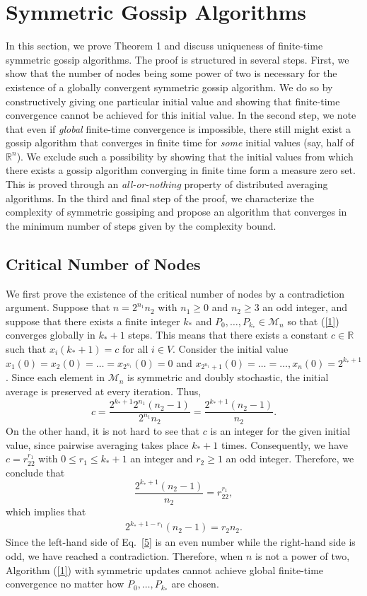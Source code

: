 \documentclass[a4paper, 11pt]{article}
\begin{document}
\section{Symmetric Gossip Algorithms}\label{Sec:Symmetric}
In this section, we prove Theorem 1 and discuss uniqueness of finite-time symmetric gossip algorithms. The proof is structured in several steps. First, we show that the number of nodes being some power of two is necessary for the existence of a globally convergent symmetric gossip algorithm. We do so by constructively giving one particular initial value and showing that finite-time convergence cannot be achieved for this initial value. In the second step, we note that even if {\it global} finite-time convergence is impossible, there still might exist a gossip algorithm that converges in finite time  for \emph{some} initial values (say, half of $\mathbb{R}^n$).  We exclude such a possibility by showing that the initial values from which there exists a gossip algorithm converging in finite time  form a measure zero set. This is proved through an {\em all-or-nothing} property of distributed averaging algorithms.  In the third and final step of the proof, we characterize the complexity of symmetric gossiping and propose an algorithm that converges in the minimum number of steps given by the complexity bound.



\subsection{Critical Number of Nodes} We first prove the existence of the critical number of nodes by a contradiction argument.  Suppose that $n=2^{n_1} n_2$ with $n_1\geq0$ and $n_2\geq 3$ an odd integer, and suppose that there exists a finite integer $k_\ast$ and $P_0,\dots, P_{k_\ast}\in \mathscr{M}_n$ so that (\ref{1}) converges globally in $k_\ast+1$ steps.  This means that there exists a constant $c\in \mathbb{R}$ such that $x_i(k_\ast+1)=c$ for all $i\in V$.
Consider the initial value $x_1(0)=x_2(0)=\dots=x_{2^{n_1}}(0)=0$ and $x_{2^{n_1}+1}(0)=\dots=\dots,x_n(0)=2^{k_\ast+1}$. Since each element in $ \mathscr{M}_n$ is symmetric and doubly stochastic, the initial average is preserved at every iteration. Thus,
$$
c=\frac{2^{k_\ast+1}2^{n_1} (n_2-1)}{2^{n_1} n_2}=\frac{2^{k_\ast+1}(n_2-1)}{n_2}.
$$
On the other hand, it is not hard to see that $c$ is an integer for the given initial value, since pairwise averaging takes place  $k_\ast+1$ times. Consequently, we have $c=r_22^{r_1}$ with $0\leq r_1\leq k_\ast+1$ an integer and $r_2\geq 1$ an odd integer.
Therefore, we conclude that
$$
\frac{2^{k_\ast+1}(n_2-1)}{n_2}=r_22^{r_1},
$$
which implies that
\begin{align}\label{5}
2^{k_\ast+1-r_1}(n_2-1)=r_2 n_2.
\end{align}
Since the left-hand side of Eq.~\eqref{5} is an even number while the right-hand side is odd, we have reached a contradiction.  Therefore, when $n$ is not a power of two, Algorithm (\ref{1}) with symmetric updates cannot achieve global finite-time convergence no matter how $P_0,\dots, P_{k_\ast}$ are chosen.
\end{document}
